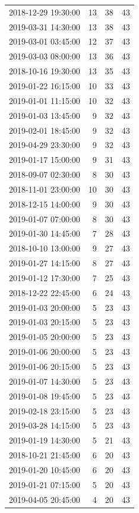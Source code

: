 \begin{tabular}{lrrr}
2018-12-29 19:30:00 & 13 & 38 & 43 \\
2019-03-31 14:30:00 & 13 & 38 & 43 \\
2019-03-01 03:45:00 & 12 & 37 & 43 \\
2019-03-03 08:00:00 & 13 & 36 & 43 \\
2018-10-16 19:30:00 & 13 & 35 & 43 \\
2019-01-22 16:15:00 & 10 & 33 & 43 \\
2019-01-01 11:15:00 & 10 & 32 & 43 \\
2019-01-03 13:45:00 & 9 & 32 & 43 \\
2019-02-01 18:45:00 & 9 & 32 & 43 \\
2019-04-29 23:30:00 & 9 & 32 & 43 \\
2019-01-17 15:00:00 & 9 & 31 & 43 \\
2018-09-07 02:30:00 & 8 & 30 & 43 \\
2018-11-01 23:00:00 & 10 & 30 & 43 \\
2018-12-15 14:00:00 & 9 & 30 & 43 \\
2019-01-07 07:00:00 & 8 & 30 & 43 \\
2019-01-30 14:45:00 & 7 & 28 & 43 \\
2018-10-10 13:00:00 & 9 & 27 & 43 \\
2019-01-27 14:15:00 & 8 & 27 & 43 \\
2019-01-12 17:30:00 & 7 & 25 & 43 \\
2018-12-22 22:45:00 & 6 & 24 & 43 \\
2019-01-03 20:00:00 & 5 & 23 & 43 \\
2019-01-03 20:15:00 & 5 & 23 & 43 \\
2019-01-05 20:00:00 & 5 & 23 & 43 \\
2019-01-06 20:00:00 & 5 & 23 & 43 \\
2019-01-06 20:15:00 & 5 & 23 & 43 \\
2019-01-07 14:30:00 & 5 & 23 & 43 \\
2019-01-08 19:45:00 & 5 & 23 & 43 \\
2019-02-18 23:15:00 & 5 & 23 & 43 \\
2019-03-28 14:15:00 & 5 & 23 & 43 \\
2019-01-19 14:30:00 & 5 & 21 & 43 \\
2018-10-21 21:45:00 & 6 & 20 & 43 \\
2019-01-20 10:45:00 & 6 & 20 & 43 \\
2019-01-21 07:15:00 & 5 & 20 & 43 \\
2019-04-05 20:45:00 & 4 & 20 & 43 \\

\end{tabular}
